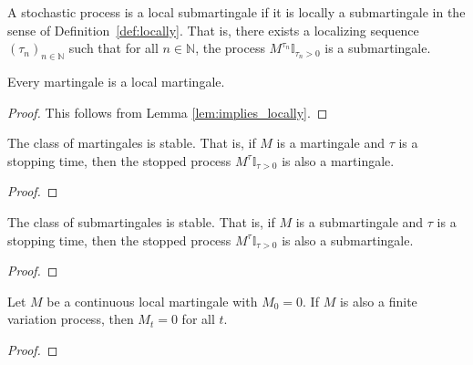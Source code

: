 \begin{definition}\label{def:IsLocalSubmartingale}
  \leanok
A stochastic process is a local submartingale if it is locally a submartingale in the sense of Definition~\ref{def:locally}.
That is, there exists a localizing sequence $(\tau_n)_{n \in \mathbb{N}}$ such that for all $n \in \mathbb{N}$, the process $M^{\tau_n}\mathbb{I}_{\tau_n > 0}$ is a submartingale.
\end{definition}


\begin{lemma}\label{lem:Martingale.IsLocalMartingale}
  \leanok
Every martingale is a local martingale.
\end{lemma}

\begin{proof}\leanok
This follows from Lemma \ref{lem:implies_locally}.
\end{proof}


\begin{lemma}\label{lem:stable_IsMartingale}
  \leanok
The class of martingales is stable. That is, if $M$ is a martingale and $\tau$ is a stopping time, then the stopped process $M^{\tau}\mathbb{I}_{\tau > 0}$ is also a martingale.
\end{lemma}

\begin{proof}

\end{proof}


\begin{lemma}\label{lem:stable_IsSubmartingale}
  \leanok
The class of submartingales is stable. That is, if $M$ is a submartingale and $\tau$ is a stopping time, then the stopped process $M^{\tau}\mathbb{I}_{\tau > 0}$ is also a submartingale.
\end{lemma}

\begin{proof}

\end{proof}


\begin{theorem}\label{thm:IsLocalMartingale.eq_zero_of_finiteVariation}
Let $M$ be a continuous local martingale with $M_0 = 0$. If $M$ is also a finite variation process, then $M_t = 0$ for all $t$.
\end{theorem}

\begin{proof}

\end{proof}
